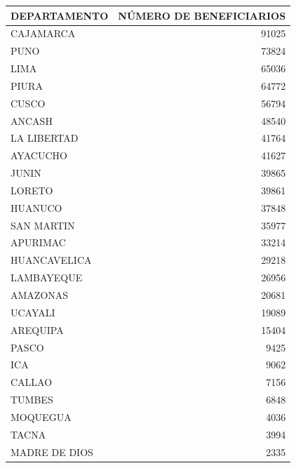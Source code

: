 \documentclass[12pt]{article}
\begin{document}
\begin{center}
\scriptsize %
\begin{tabular}{|l|r|}
    \hline
    \textbf{DEPARTAMENTO} & \textbf{NÚMERO DE BENEFICIARIOS} \\
    \hline
    CAJAMARCA        & 91025                   \\
    PUNO             & 73824                   \\
    LIMA             & 65036                   \\
    PIURA            & 64772                   \\
    CUSCO            & 56794                   \\
    ANCASH           & 48540                   \\
    LA LIBERTAD      & 41764                   \\
    AYACUCHO         & 41627                   \\
    JUNIN            & 39865                   \\
    LORETO           & 39861                   \\
    HUANUCO          & 37848                   \\
    SAN MARTIN       & 35977                   \\
    APURIMAC         & 33214                   \\
    HUANCAVELICA     & 29218                   \\
    LAMBAYEQUE       & 26956                   \\
    AMAZONAS         & 20681                   \\
    UCAYALI          & 19089                   \\
    AREQUIPA         & 15404                   \\
    PASCO            & 9425                    \\
    ICA              & 9062                    \\
    CALLAO           & 7156                    \\
    TUMBES           & 6848                    \\
    MOQUEGUA         & 4036                    \\
    TACNA            & 3994                    \\
    MADRE DE DIOS    & 2335                    \\
    \hline
\end{tabular}
\end{center}
\end{document}
